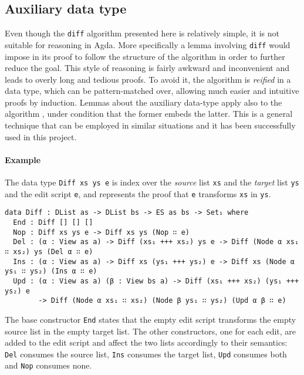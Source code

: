 \documentclass[../Thesis.tex]{subfiles}
\begin{document}
		\subsection{Auxiliary data type} 	
	Even though the \texttt{diff} algorithm presented here is relatively simple,
	it is not suitable for reasoning in Agda. More specifically a lemma involving
	\texttt{diff} would impose in its proof to follow the structure of the 
	algorithm	in order to further reduce the goal.
	This style of reasoning is fairly awkward and inconvenient and 
	leads to overly long and tedious proofs. To avoid it, the algorithm is 
	\emph{reified}	in a data type, which can be pattern-matched over, allowing
	much easier and intuitive proofs by induction.
	Lemmas about the auxiliary data-type apply also to the algorithm	, under
	condition that the former embeds the latter.
	This is a general technique that can be employed in similar situations and 
	it has been successfully used in this project.
	
	\paragraph{Example}
	The data type \texttt{Diff xs ys e} is index over the \emph{source}  list 
	\texttt{xs} and the \emph{target} list \texttt{ys} and the edit script 
	\texttt{e},  and represents the proof that \texttt{e} transforms \texttt{xs} 
	in \texttt{ys}.

	\begin{verbatim}
data Diff : DList as -> DList bs -> ES as bs -> Set₁ where
  End : Diff [] [] []
  Nop : Diff xs ys e -> Diff xs ys (Nop ∷ e)
  Del : (α : View as a) -> Diff (xs₁ +++ xs₂) ys e -> Diff (Node α xs₁ ∷ xs₂) ys (Del α ∷ e)
  Ins : (α : View as a) -> Diff xs (ys₁ +++ ys₂) e -> Diff xs (Node α ys₁ ∷ ys₂) (Ins α ∷ e)
  Upd : (α : View as a) (β : View bs a) -> Diff (xs₁ +++ xs₂) (ys₁ +++ ys₂) e 
        -> Diff (Node α xs₁ ∷ xs₂) (Node β ys₁ ∷ ys₂) (Upd α β ∷ e)
\end{verbatim}

	The base constructor \texttt{End} states that the empty edit script 
	transforms the empty source list in the empty target list.
	The other constructors, one for each edit, are added to the edit script
	and affect the two lists accordingly to their semantics: 
	\texttt{Del} consumes the source list, \texttt{Ins} consumes the target list, 
	\texttt{Upd} consumes both and \texttt{Nop} consumes none.	
\end{document}
